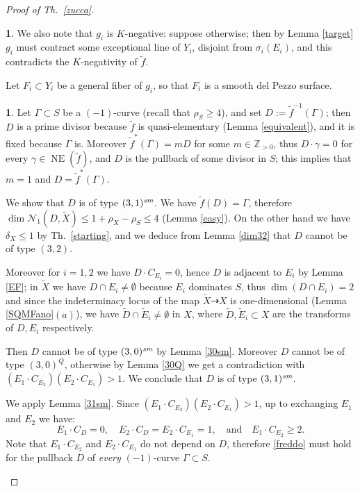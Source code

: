 \documentclass[a4paper,12pt]{amsart}
\theoremstyle{definition}
\newtheorem{prg}[thm]{}
\numberwithin{figure}{section}
\numberwithin{table}{section}
\newcommand{\w}{\widetilde}
\newcommand{\Z}{\mathbb{Z}}
\newcommand{\N}{\mathcal{N}_1}
\newcommand{\NE}{\operatorname{NE}}
\newcommand{\sm}{\text{\it sm}}
\begin{document}
\begin{proof}[Proof of Th.~\ref{zucca}]
\begin{prg}
  We also note that $g_i$ is $K$-negative: suppose otherwise; then by Lemma \ref{target} $g_i$ must contract some exceptional line of  $Y_i$, disjoint from $\sigma_i(E_i)$, and this contradicts the $K$-negativity of $\tilde{f}$.

   Let $F_i\subset Y_i$ be a general fiber of $g_i$, so that $F_i$ is a smooth del Pezzo surface.
\end{prg}
\begin{prg}\label{lucia}
  Let   $\Gamma\subset S$ be a $(-1)$-curve (recall that $\rho_S\geq 4$), and set $D:=\tilde{f}^{-1}(\Gamma)$; then $D$ is a prime divisor because $\tilde{f}$ is quasi-elementary (Lemma \ref{equivalent}), and it is fixed because $\Gamma$ is. Moreover $\tilde{f}^{*}(\Gamma)=mD$ for some $m\in\Z_{>0}$, thus $D\cdot \gamma=0$ for every $\gamma\in\NE(\tilde{f})$, and $D$ is the pullback of some divisor in $S$; this implies that $m=1$ and  $D=\tilde{f}^{*}(\Gamma)$.

  We show that $D$ is of type $(3,1)^{\sm}$.
We have $\tilde{f}(D)=\Gamma$, therefore $\dim\N(D,\w{X})\leq 1+\rho_X-\rho_S\leq 4$
(Lemma \ref{easy}).
On the other hand we have
 $\delta_X\leq 1$ by Th.~\ref{starting}, and we deduce from Lemma \ref{dim32} that  $D$ cannot be of type $(3,2)$.

Moreover for $i=1,2$ we have $D\cdot C_{E_i}=0$, hence $D$ is adjacent to $E_i$ by Lemma \ref{EF}; in $\w{X}$ we have ${D}\cap {E}_i\neq\emptyset$ because ${E}_i$ dominates $S$, thus $\dim({D}\cap{E}_i)=2$ and since the indeterminacy locus of the map $\w{X}\dasharrow X$ is one-dimensional (Lemma \ref{SQMFano}$(a)$), we have $\w{D}\cap \w{E}_i\neq\emptyset$ in $X$, where $\w{D},\w{E}_i\subset X$ are the transforms of $D,E_i$ respectively.

Then $D$ cannot be of type $(3,0)^{\sm}$ by Lemma \ref{30sm}. Moreover $D$ cannot be of type $(3,0)^Q$, otherwise by Lemma \ref{30Q} we get a contradiction with  $(E_1\cdot C_{E_2})(E_2\cdot C_{E_1})>1$. We conclude that $D$ is of type $(3,1)^{\sm}$.
 
We apply Lemma \ref{31sm}. Since $(E_1\cdot C_{E_2})(E_2\cdot C_{E_1})>1$, up to exchanging $E_1$ and $E_2$ we have:
\begin{equation}\label{freddo}
E_{1}\cdot C_D=0,\quad E_{2}\cdot C_D=E_{2}\cdot C_{E_{1}}=1,\quad \text{and}\quad E_{1}\cdot C_{E_{2}}\geq 2.\end{equation}
 Note that $E_1\cdot C_{E_2}$ and $E_2\cdot C_{E_1}$ do not depend on $D$,
therefore \eqref{freddo} must hold for 
the pullback $D$ of \emph{every} $(-1)$-curve $\Gamma\subset S$.


\end{prg}
\end{proof}
\end{document}
